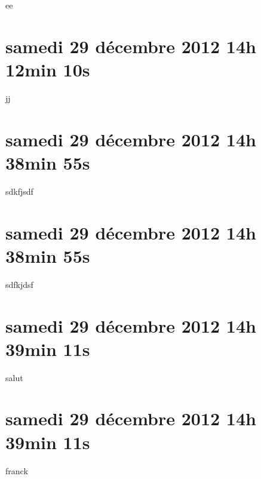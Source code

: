 ee

\section{samedi 29 décembre 2012 14h 12min 10s}

jj

\section{samedi 29 décembre 2012 14h 38min 55s}

sdkfjsdf

\section{samedi 29 décembre 2012 14h 38min 55s}

sdfkjdsf

\section{samedi 29 décembre 2012 14h 39min 11s}

salut

\section{samedi 29 décembre 2012 14h 39min 11s}

franck
